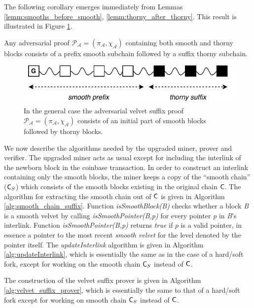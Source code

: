 The following corollary emerges immediately from Lemmas \ref{lemm:smooths_before_smooth}, \ref{lemm:thorny_after_thorny}. This result is illustrated in Figure \ref{fig:adversarial_velvet_proof}.

\begin{corollary}
	Any adversarial proof $\mathcal{P_A} = (\pi_\mathcal{A}, \chi_\mathcal{A})$ containing both smooth and thorny blocks consists of a prefix smooth subchain followed by a suffix thorny subchain.
	\label{cor:adversarial_proof_scheme}
\end{corollary}

\begin{figure}[h!]
	\begin{center}
		\includegraphics[width=0.9\columnwidth]{figures/adversarial_velvet_proof.pdf}
	\end{center}
	\caption{In the general case the adversarial velvet suffix proof $\mathcal{P_A} = (\pi_\mathcal{A}, \chi_\mathcal{A})$ consists of an initial part of smooth blocks followed by thorny blocks.}
	\label{fig:adversarial_velvet_proof}
\end{figure}
We now describe the algorithms needed by the upgraded miner, prover and verifier. The upgraded miner acts as usual except for including the interlink of the newborn block in the coinbase transaction. In order to construct an interlink containing only the smooth blocks, the miner keeps a copy of the ``smooth chain'' ($\mathsf{C}_S$) which consists of the smooth blocks existing in the original chain $\mathsf{C}$. The algorithm for extracting the smooth chain out of $\mathsf{C}$ is given in Algorithm \ref{alg:smooth_chain_suffix}. Function \textit{isSmoothBlock(B)} checks whether a block \textit{B} is a smooth velvet by calling \textit{isSmoothPointer(B,p)} for every pointer \textit{p} in \textit{B}'s interlink. Function \textit{isSmoothPointer(B,p)} returns \emph{true} if $p$ is a valid pointer, in essence a pointer to the most recent \emph{smooth velvet} for the level denoted by the pointer itself. The \textit{updateInterlink} algorithm is given in Algorithm \ref{alg:updateInterlink}, which is essentially the same as in the case of a hard/soft fork, except for working on the smooth chain $\mathsf{C}_S$ instead of $\mathsf{C}$.

The construction of the velvet suffix prover is given in Algorithm \ref{alg:velvet_suffix_prover}, which is essentially the same to that of a hard/soft fork except for working on smooth chain $\mathsf{C}_S$ instead of $\mathsf{C}$.

